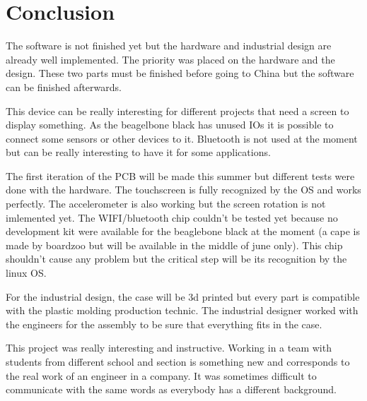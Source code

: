 \section{Conclusion}

The software is not finished yet but the hardware and industrial design are already well implemented. The priority was placed on the hardware and the design. These two parts must be finished before going to China but the software can be finished afterwards.

This device can be really interesting for different projects that need a screen to display something. As the beagelbone black has unused IOs it is possible to connect some sensors or other devices to it. Bluetooth is not used at the moment but can be really interesting to have it for some applications.

The first iteration of the PCB will be made this summer but different tests were done with the hardware. The touchscreen is fully recognized by the OS and works perfectly. The accelerometer is also working but the screen rotation is not imlemented yet. The WIFI/bluetooth chip couldn't be tested yet because no development kit were available for the beaglebone black at the moment (a cape is made by boardzoo but will be available in the middle of june only). This chip shouldn't cause any problem but the critical step will be its recognition by the linux OS.

For the industrial design, the case will be 3d printed but every part is compatible with the plastic molding production technic. The industrial designer worked with the engineers for the assembly to be sure that everything fits in the case.

This project was really interesting and instructive. Working in a team with students from different school and section is something new and corresponds to the real work of an engineer in a company. It was sometimes difficult to communicate with the same words as everybody has a different background.
